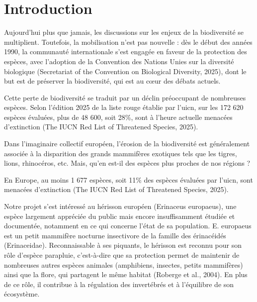 \setcounter{secnumdepth}{-1}

\chapter{Introduction}

Aujourd’hui plus que jamais, les discussions sur les enjeux de la biodiversité se multiplient. Toutefois, la mobilisation n’est pas nouvelle : dès le début des années 1990, la communauté internationale s’est engagée en faveur de la protection des espèces, avec l’adoption de la Convention des Nations Unies sur la diversité biologique (Secretariat of the Convention on Biological Diversity, 2025), dont le but est de préserver la biodiversité, qui est au cœur des débats actuels. 

Cette perte de biodiversité se traduit par un déclin préoccupant de nombreuses espèces. Selon l'édition 2025 de la liste rouge établie par l’\gls{uicn}, sur les 172 620 espèces évaluées, plus de 48 600, soit 28\%, sont à l’heure actuelle menacées d’extinction (The IUCN Red List of Threatened Species, 2025). 

Dans l’imaginaire collectif européen, l’érosion de la biodiversité est généralement associée à la disparition des grands mammifères exotiques tels que les tigres, lions, rhinocéros, etc. Mais, qu’en est-il des espèces plus proches de nos régions ? 

En Europe, au moins 1 677 espèces, soit 11\% des espèces évaluées par l’\gls{uicn}, sont menacées d’extinction (The IUCN Red List of Threatened Species, 2025).

Notre projet s’est intéressé au hérisson européen (Erinaceus europaeus), une espèce largement appréciée du public mais encore insuffisamment étudiée et documentée, notamment en ce qui concerne l’état de sa population. E. europaeus est un petit mammifère nocturne insectivore de la famille des érinacéidés (Erinaceidae). Reconnaissable à ses piquants, le hérisson est reconnu pour son rôle d’espèce parapluie, c’est-à-dire que sa protection permet de maintenir de nombreuses autres espèces animales (amphibiens, insectes, petits mammifères) ainsi que la flore, qui partagent le même habitat (Roberge et al., 2004). En plus de ce rôle, il contribue à la régulation des invertébrés et à l’équilibre de son écosystème. 


